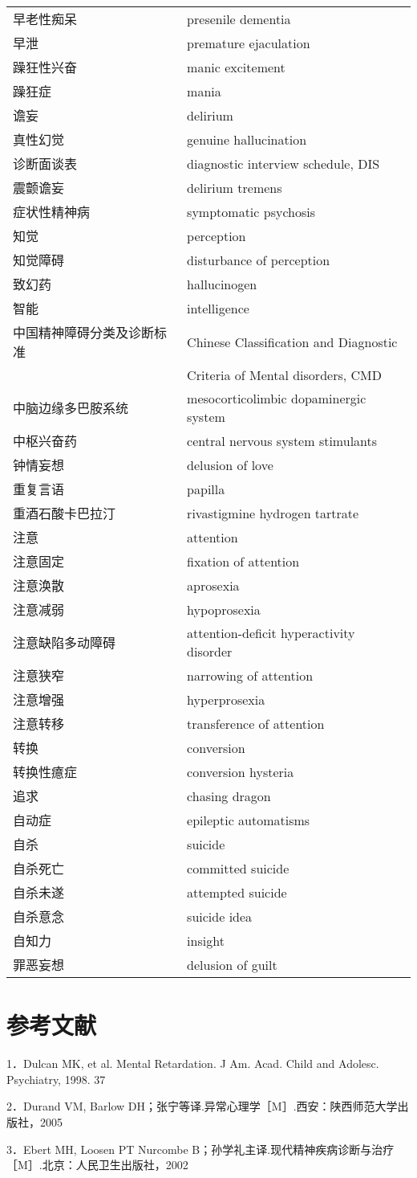\begin{longtable}[]{@{}ll@{}}
\toprule
\endhead
早老性痴呆 & presenile dementia\tabularnewline
早泄 & premature ejaculation\tabularnewline
躁狂性兴奋 & manic excitement\tabularnewline
躁狂症 & mania\tabularnewline
谵妄 & delirium\tabularnewline
真性幻觉 & genuine hallucination\tabularnewline
诊断面谈表 & diagnostic interview schedule, DIS\tabularnewline
震颤谵妄 & delirium tremens\tabularnewline
症状性精神病 & symptomatic psychosis\tabularnewline
知觉 & perception\tabularnewline
知觉障碍 & disturbance of perception\tabularnewline
致幻药 & hallucinogen\tabularnewline
智能 & intelligence\tabularnewline
中国精神障碍分类及诊断标准 & Chinese Classification and Diagnostic\tabularnewline
& Criteria of Mental disorders, CMD\tabularnewline
中脑边缘多巴胺系统 & mesocorticolimbic dopaminergic
system\tabularnewline
中枢兴奋药 & central nervous system stimulants\tabularnewline
钟情妄想 & delusion of love\tabularnewline
重复言语 & papilla\tabularnewline
重酒石酸卡巴拉汀 & rivastigmine hydrogen tartrate\tabularnewline
注意 & attention\tabularnewline
注意固定 & fixation of attention\tabularnewline
注意涣散 & aprosexia\tabularnewline
注意减弱 & hypoprosexia\tabularnewline
注意缺陷多动障碍 & attention-deficit hyperactivity
disorder\tabularnewline
注意狭窄 & narrowing of attention\tabularnewline
注意增强 & hyperprosexia\tabularnewline
注意转移 & transference of attention\tabularnewline
转换 & conversion\tabularnewline
转换性癔症 & conversion hysteria\tabularnewline
追求 & chasing dragon\tabularnewline
自动症 & epileptic automatisms\tabularnewline
自杀 & suicide\tabularnewline
自杀死亡 & committed suicide\tabularnewline
自杀未遂 & attempted suicide\tabularnewline
自杀意念 & suicide idea\tabularnewline
自知力 & insight\tabularnewline
罪恶妄想 & delusion of guilt\tabularnewline
\bottomrule
\end{longtable}

\protect\hypertarget{text00029.html}{}{}

\chapter{参考文献}

1．Dulcan MK, et al. Mental Retardation. J Am. Acad. Child and Adolesc.
Psychiatry, 1998. 37

2．Durand VM, Barlow
DH；张宁等译.异常心理学［M］.西安：陕西师范大学出版社，2005

3．Ebert MH, Loosen PT Nurcombe
B；孙学礼主译.现代精神疾病诊断与治疗［M］.北京：人民卫生出版社，2002

